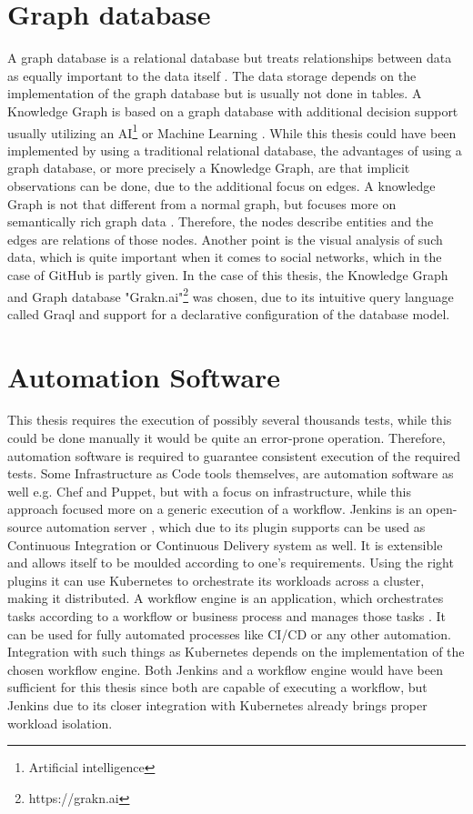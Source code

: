 \section{Graph database}
\label{sec:background-graph}
A graph database is a relational database but treats relationships between data as equally important to the data itself \cite{graphdb}. The data storage depends on the implementation of the graph database but is usually not done in tables.
A Knowledge Graph is based on a graph database with additional decision support usually utilizing an AI\footnote{Artificial intelligence} or Machine Learning \cite{knowledgegraph}. While this thesis could have been implemented by using a traditional relational database, the advantages of using a graph database, or more precisely a Knowledge Graph, are that implicit observations can be done, due to the additional focus on edges. A knowledge Graph is not that different from a normal graph, but focuses more on semantically rich graph data \cite{graknKnowledge}. Therefore, the nodes describe entities and the edges are relations of those nodes. Another point is the visual analysis of such data, which is quite important when it comes to social networks, which in the case of GitHub is partly given.
In the case of this thesis, the Knowledge Graph and Graph database "Grakn.ai"\footnote{https://grakn.ai} was chosen, due to its intuitive query language called Graql and support for a declarative configuration of the database model.

\section{Automation Software}
\label{sec:background-automation}
This thesis requires the execution of possibly several thousands tests, while this could be done manually it would be quite an error-prone operation. Therefore, automation software is required to guarantee consistent execution of the required tests. Some Infrastructure as Code tools themselves, are automation software as well e.g. Chef and Puppet, but with a focus on infrastructure, while this approach focused more on a generic execution of a workflow.
Jenkins is an open-source automation server \cite{jenkins}, which due to its plugin supports can be used as Continuous Integration or Continuous Delivery system as well. It is extensible and allows itself to be moulded according to one's requirements. Using the right plugins it can use Kubernetes to orchestrate its workloads across a cluster, making it distributed.
A workflow engine is an application, which orchestrates tasks according to a workflow or business process and manages those tasks \cite{workflow}. It can be used for fully automated processes like CI/CD or any other automation. Integration with such things as Kubernetes depends on the implementation of the chosen workflow engine.
Both Jenkins and a workflow engine would have been sufficient for this thesis since both are capable of executing a workflow, but Jenkins due to its closer integration with Kubernetes already brings proper workload isolation.

